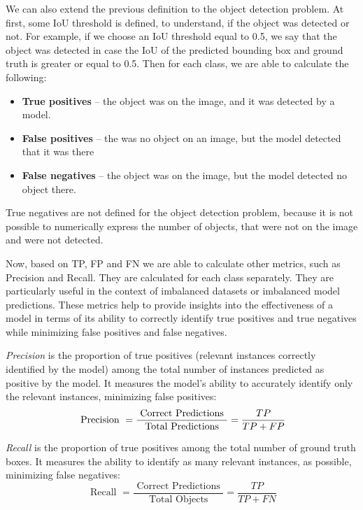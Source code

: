 \documentclass[14pt,a4paper]{extarticle}
\newcounter{e}
\numberwithin{equation}{section}
\numberwithin{figure}{section}
\begin{document}
We can also extend the previous definition to the object detection problem. At first, some IoU threshold is defined, to understand, if the object was detected or not. For example, if we choose an IoU threshold equal to 0.5, we say that the object was detected in case the IoU of the predicted bounding box and ground truth is greater or equal to 0.5. Then for each class, we are able to calculate the following:
\begin{itemize}
    \item \textbf{True positives} -- the object was on the image, and it was detected by a model.
    \item \textbf{False positives} -- the was no object on an image, but the model detected that it was there
    \item \textbf{False negatives} -- the object was on the image, but the model detected no object there.  
\end{itemize}
True negatives are not defined for the object detection problem, because it is not possible to numerically express the number of objects, that were not on the image and were not detected.

Now, based on TP, FP and FN we are able to calculate other metrics, such as Precision and Recall. They are calculated for each class separately. They are particularly useful in the context of imbalanced datasets or imbalanced model predictions. These metrics help to provide insights into the effectiveness of a model in terms of its ability to correctly identify true positives and true negatives while minimizing false positives and false negatives.

\textit{Precision} is the proportion of true positives (relevant instances correctly identified by the model) among the total number of instances predicted as positive by the model. It measures the model's ability to accurately identify only the relevant instances, minimizing false positives:
\begin{equation}
    \text { Precision }=\frac{\text { Correct Predictions }}{\text { Total Predictions }}=\frac{T P}{T P+F P} \\
\end{equation}

\textit{Recall} is the proportion of true positives among the total number of ground truth boxes. It measures the ability to identify as many relevant instances, as possible, minimizing false negatives:
\begin{equation}
    \text { Recall }=\frac{\text { Correct Predictions }}{\text { Total Objects }}=\frac{T P}{T P+F N}
\end{equation}
\end{document}
